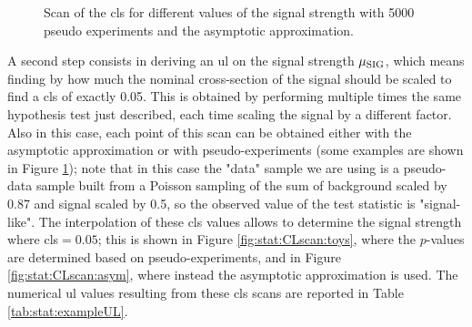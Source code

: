 \begin{figure}[h]
\centering 
{}
\caption{
Scan of the \gls{cls} for different values of the signal strength with  5000 pseudo experiments and  the asymptotic approximation.
}
\label{fig:stat:CLscan}
\end{figure}

A second step consists in deriving an \gls{ul} on the signal strength $\mu_{\rm SIG}$, which means finding by how much the 
nominal cross-section of the signal should be scaled to find a \gls{cls} of exactly 0.05. This is obtained by performing multiple times the same hypothesis test just described, each time scaling the signal by a different factor. 
Also in this case, each point of this scan can be obtained either with the asymptotic approximation or with pseudo-experiments (some examples are shown in Figure \ref{fig:stat:CLscan}); note that in this case the "data" sample we are using is a pseudo-data sample built from a Poisson sampling 
of the sum of background scaled by 0.87 and signal scaled by 0.5, so the observed value of the test statistic is "signal-like".
The interpolation of these \gls{cls} values  allows to determine the signal strength where \gls{cls}$=0.05$; 
this is shown in Figure \ref{fig:stat:CLscan:toys}, where the $p$-values are determined based on pseudo-experiments, 
and in Figure \ref{fig:stat:CLscan:asym}, where instead the asymptotic approximation is used.
The numerical \gls{ul} values resulting from these \gls{cls} scans are reported in Table \ref{tab:stat:exampleUL}.


